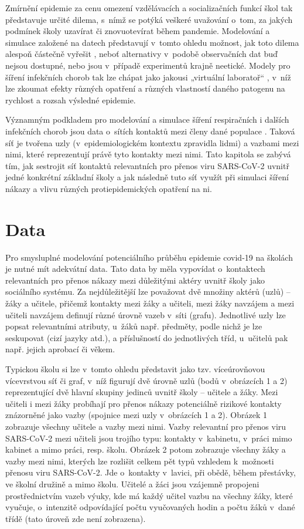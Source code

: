 Zmírnění epidemie za cenu omezení vzdělávacích a socializačních funkcí škol tak představuje určité dilema, s~nímž se potýká veškeré uvažování o~tom, za jakých podmínek školy uzavírat či znovuotevírat během pandemie. Modelování a simulace založené na datech představují v~tomto ohledu možnost, jak toto dilema alespoň částečně vyřešit \cite{squazzoni2020computational}, neboť alternativy v~podobě observačních dat buď nejsou dostupné, nebo jsou v~případě experimentů krajně neetické. Modely pro šíření infekčních chorob tak lze chápat jako jakousi „virtuální laboratoř“ \cite{Rao_etal2021}, v~níž lze zkoumat efekty různých opatření a různých vlastností daného patogenu na rychlost a rozsah výsledné epidemie.

Významným podkladem pro modelování a simulace šíření respiračních i dalších infekčních chorob jsou data o~sítích kontaktů mezi členy dané populace \cite{danon2011networks, luke2007network, zaj:mossong2008social}. Taková síť je tvořena uzly (v~epidemiologickém kontextu zpravidla lidmi) a vazbami mezi nimi, které reprezentují právě tyto kontakty mezi nimi. Tato kapitola se zabývá tím, jak sestrojit síť kontaktů relevantních pro přenos viru SARS-CoV-2 uvnitř jedné konkrétní základní školy a jak následně tuto síť využít při simulaci šíření nákazy a vlivu různých protiepidemických opatření na ni. 


\section*{Data} 
Pro smysluplné modelování potenciálního průběhu epidemie covid-19 na školách je nutné mít adekvátní data. Tato data by měla vypovídat o~kontaktech relevantních pro přenos nákazy mezi důležitými aktéry uvnitř školy jako sociálního systému. Za nejdůležitější lze považovat dvě množiny aktérů (uzlů) – žáky a učitele, přičemž kontakty mezi žáky a učiteli, mezi žáky navzájem a mezi učiteli navzájem definují různé úrovně vazeb v~síti (grafu). Jednotlivé uzly lze popsat relevantními atributy, u~žáků např. předměty, podle nichž je lze seskupovat (cizí jazyky atd.), a příslušností do jednotlivých tříd, u~učitelů pak např. jejich aprobací či věkem. 

Typickou školu si lze v~tomto ohledu představit jako tzv. víceúrovňovou vícevrstvou síť či graf, v~níž figurují dvě úrovně uzlů (bodů v~obrázcích 1 a 2) reprezentující dvě hlavní skupiny jedinců uvnitř školy – učitele a žáky. Mezi učiteli i mezi žáky probíhají pro přenos nákazy potenciálně rizikové kontakty znázorněné jako vazby (spojnice mezi uzly v~obrázcích 1 a 2). Obrázek 1 zobrazuje všechny učitele a vazby mezi nimi. Vazby relevantní pro přenos viru SARS-CoV-2 mezi učiteli jsou trojího typu: kontakty v~kabinetu, v~práci mimo kabinet a mimo práci, resp. školu. Obrázek 2 potom zobrazuje všechny žáky a vazby mezi nimi, kterých lze rozlišit celkem pět typů vzhledem k~možnosti přenosu viru SARS-CoV-2. Jde o~kontakty v~lavici, při obědě, během přestávky, ve školní družině a mimo školu. Učitelé a žáci jsou vzájemně propojeni prostřednictvím vazeb výuky, kde má každý učitel vazbu na všechny žáky, které vyučuje, o~intenzitě odpovídající počtu vyučovaných hodin a počtu žáků v~dané třídě (tato úroveň zde není zobrazena).

